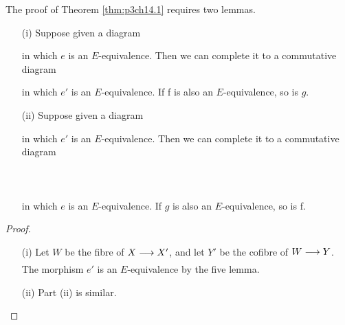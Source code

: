 \documentclass[../main]{subfiles}
\begin{document}
The proof of Theorem \ref{thm:p3ch14.1} requires two lemmas.
\begin{lemma} \label{lem:p3ch14.7}
\begin{enumerate} 
 \item [(i)] Suppose given a diagram

in which $e$ is an $E$-equivalence. Then we can complete it to a commutative diagram 

in which $e'$ is an $E$-equivalence. If f is also an $E$-equivalence, so is $g$.
\item [(ii)] Suppose given a diagram 

      in which $e'$ is an $E$-equivalence. Then we can complete it to a commutative diagram 
~\\~\\
 ~\\~\\
in which $e$ is an $E$-equivalence. If $g$ is also an $E$-equivalence, so is f.
  \end{enumerate}
\begin{proof} 
  \begin{enumerate} 
    \item [(i)] Let $W$ be the fibre of $X \lar{} X'$, and let $Y'$ be the cofibre of $W \lar{}  Y$. The morphism $e'$ is an $E$-equivalence by the five lemma.
      \item [(ii)]  Part (ii) is similar. 
  \end{enumerate}   
\end{proof}
  \end{lemma}
\end{document}
